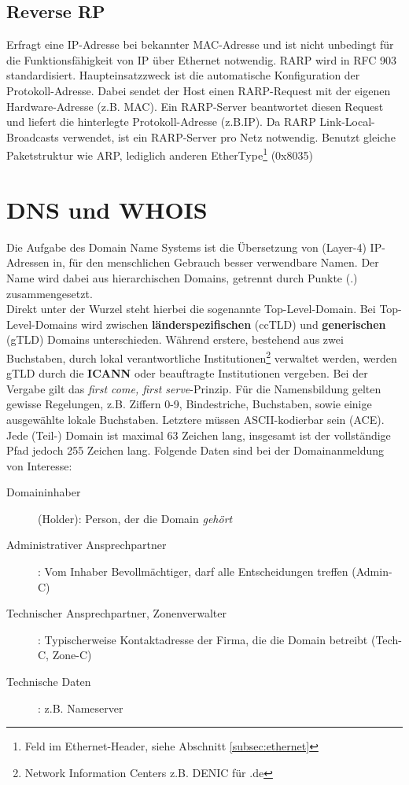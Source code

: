 \documentclass{article} %
\begin{document}
\subsection{Reverse RP}

Erfragt eine IP-Adresse bei bekannter MAC-Adresse und ist nicht unbedingt für die Funktionsfähigkeit von IP über Ethernet notwendig.
RARP wird in RFC 903 \cite{rfc903} standardisiert.
Haupteinsatzzweck ist die automatische Konfiguration der Protokoll-Adresse.
Dabei sendet der Host einen RARP-Request mit der eigenen Hardware-Adresse (z.B. MAC).
Ein RARP-Server beantwortet diesen Request und liefert die hinterlegte Protokoll-Adresse (z.B.IP).
Da RARP Link-Local-Broadcasts verwendet, ist ein RARP-Server pro Netz notwendig.
Benutzt gleiche Paketstruktur wie ARP, lediglich anderen EtherType\footnote{Feld im Ethernet-Header, siehe Abschnitt \ref{subsec:ethernet}} (0x8035)

\section{DNS und WHOIS}

Die Aufgabe des Domain Name Systems ist die Übersetzung von (Layer-4) IP-Adressen in, für den menschlichen Gebrauch besser verwendbare Namen.
Der Name wird dabei aus hierarchischen Domains, getrennt durch Punkte (.) zusammengesetzt.\\
Direkt unter der Wurzel steht hierbei die sogenannte Top-Level-Domain.
Bei Top-Level-Domains wird zwischen \textbf{länderspezifischen} (ccTLD) und \textbf{generischen} (gTLD) Domains unterschieden.
Während erstere, bestehend aus zwei Buchstaben, durch lokal verantwortliche Institutionen\footnote{Network Information Centers z.B. DENIC für .de} verwaltet werden, werden gTLD durch die \textbf{ICANN} oder beauftragte Institutionen vergeben.
Bei der Vergabe gilt das \emph{first come, first serve}-Prinzip.
Für die Namensbildung gelten gewisse Regelungen, z.B. Ziffern 0-9, Bindestriche, Buchstaben, sowie einige ausgewählte lokale Buchstaben.
Letztere müssen ASCII-kodierbar sein (ACE)\cite{rfc3490}.
Jede (Teil-) Domain ist maximal 63 Zeichen lang, insgesamt ist der vollständige Pfad jedoch 255 Zeichen lang.
Folgende Daten sind bei der Domainanmeldung von Interesse:

\begin{description}
	\item[Domaininhaber](Holder): Person, der die Domain \emph{gehört}
	\item[Administrativer Ansprechpartner]: Vom Inhaber Bevollmächtiger, darf alle Entscheidungen treffen (Admin-C)
	\item[Technischer Ansprechpartner, Zonenverwalter]: Typischerweise Kontaktadresse der Firma, die die Domain betreibt (Tech-C, Zone-C)
	\item [Technische Daten]: z.B. Nameserver
\end{description}
\end{document}
